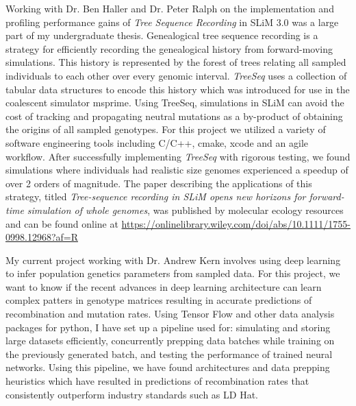 \documentclass[11pt]{amsart}
\newcommand{\sepspace}{\vspace*{1em}}		%
\begin{document}
Working with Dr. Ben Haller and Dr. Peter Ralph on the implementation and profiling performance gains of \textit{Tree Sequence Recording} in SLiM 3.0 was a large part of my undergraduate thesis.
Genealogical tree sequence recording is a strategy for efficiently recording the genealogical history from forward-moving simulations. 
This history is represented by the forest of trees relating all sampled individuals to each other over every genomic interval. 
\textit{TreeSeq} uses a collection of tabular data structures to encode this history which was introduced for use in the coalescent simulator msprime. 
Using TreeSeq, simulations in SLiM can avoid the cost of tracking and propagating neutral mutations as a by-product of obtaining the origins of all sampled genotypes.
For this project we utilized a variety of software engineering tools including C/C++, cmake, xcode and an agile workflow.
After successfully implementing \textit{TreeSeq} with rigorous testing, we found simulations where individuals had realistic size genomes experienced a speedup of over 2 orders of magnitude. 
The paper describing the applications of this strategy, titled \textit{Tree-sequence recording in SLiM opens new horizons for forward-time simulation of whole genomes}, was published by molecular ecology resources and can be found online at 
\url{https://onlinelibrary.wiley.com/doi/abs/10.1111/1755-0998.12968?af=R}
\sepspace

My current project working with Dr. Andrew Kern involves using deep learning to infer population genetics parameters from sampled data. 
For this project, we want to know if the recent advances in deep learning architecture can learn complex patters in genotype matrices resulting in accurate predictions of recombination and mutation rates. 
Using Tensor Flow and other data analysis packages for python, I have set up a pipeline used for: 
simulating and storing large datasets efficiently, 
concurrently prepping data batches while training on the previously generated batch, 
and testing the performance of trained neural networks.
Using this pipeline, we have found architectures and data prepping heuristics which have resulted in predictions of recombination rates that consistently outperform industry standards such as LD Hat. 
\sepspace


\end{document}
